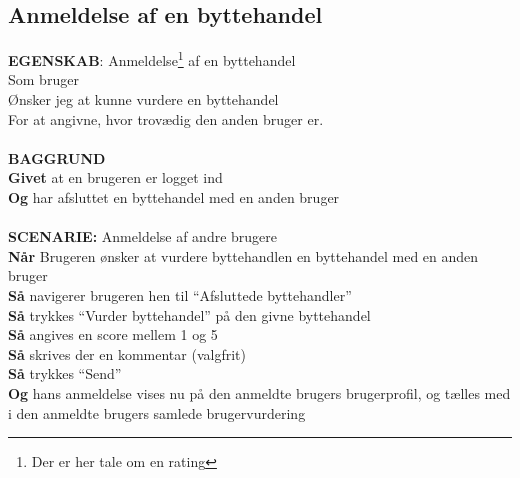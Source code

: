 \subsection{Anmeldelse af en byttehandel}
{\color{blue}\textbf{EGENSKAB}:} Anmeldelse\footnote{Der er her tale om en rating} af en byttehandel \\
Som bruger \\
Ønsker jeg at kunne vurdere en byttehandel \\
For at angivne, hvor trovædig den anden bruger er.\\ \\
{\color{blue}\textbf{BAGGRUND}} \\
{\color{blue}\textbf{Givet}} at en brugeren er logget ind \\
{\color{blue}\textbf{Og}} har afsluttet en byttehandel med en anden bruger\\\\
{\color{blue}\textbf{SCENARIE:}} Anmeldelse af andre brugere \\
{\color{blue}\textbf{Når}} Brugeren ønsker at vurdere byttehandlen en byttehandel med en anden bruger\\
{\color{blue}\textbf{Så}} navigerer brugeren hen til “Afsluttede byttehandler”\\
{\color{blue}\textbf{Så}} trykkes “Vurder byttehandel” på den givne byttehandel\\
{\color{blue}\textbf{Så}} angives en score mellem 1 og 5\\
{\color{blue}\textbf{Så}} skrives der en kommentar (valgfrit)\\
{\color{blue}\textbf{Så}} trykkes “Send”\\
{\color{blue}\textbf{Og}} hans anmeldelse vises nu på den anmeldte brugers brugerprofil, og tælles med i den anmeldte brugers samlede brugervurdering
